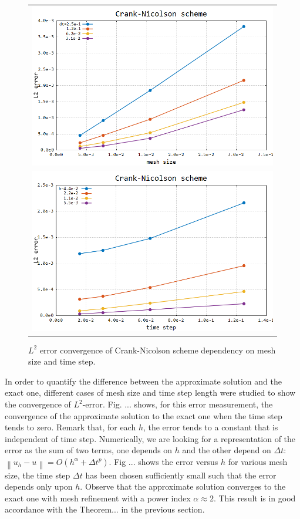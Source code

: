 \begin{figure}[b!]
	\centering
	\begin{tabular}{c}
		\includegraphics[width=.8\linewidth]{figures/CN} \\ \includegraphics[width=.8\linewidth]{figures/CNt}
	\end{tabular}
	\caption{$L^2$ error convergence of Crank-Nicolson scheme dependency on mesh size and time step.}
	\label{fig:CN}
\end{figure}
In order to quantify the difference between the approximate solution and the exact one, different cases of mesh size and time step length were studied to show the convergence of $L^2$-error. Fig. ... shows, for this error measurement, the convergence of the approximate solution to the exact one when the time step tends to zero.
Remark that, for each $h$, the error tends to a constant that is independent of time step. Numerically, we are looking for a representation of the error as the sum of two terms, one depends on $h$ and the other depend on $\Delta t$: $\left\|u_h-u\right\|=O\left(h^{\alpha}+\Delta t^{p}\right)$. Fig ... shows the error versus $h$ for various mesh size, the time step $\Delta t$ has been chosen sufficiently small such that the error depends only upon $h$. Observe that the approximate solution converges to the exact one with mesh refinement with a power index $\alpha \approx 2$. This result is in good accordance with the Theorem... in the previous section.
 
